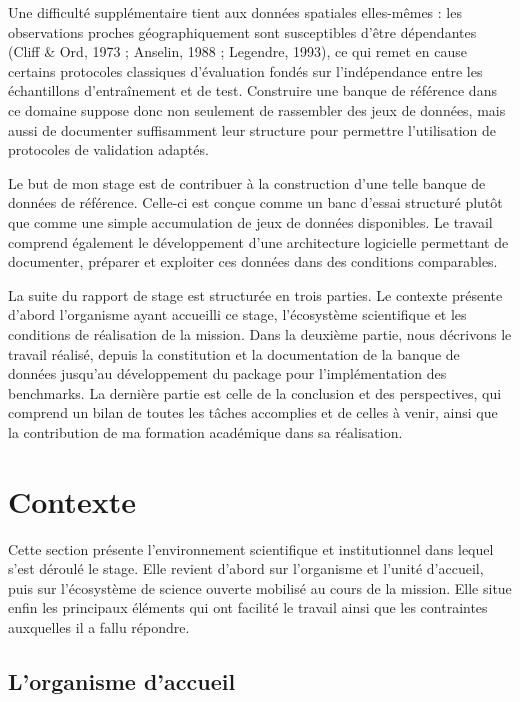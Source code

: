 \documentclass[11pt,a4paper]{article}
\begin{document}
Une difficulté supplémentaire tient aux données spatiales elles-mêmes : les observations proches géographiquement sont susceptibles d'être dépendantes (Cliff \& Ord, 1973 ; Anselin, 1988 ; Legendre, 1993), ce qui remet en cause certains protocoles classiques d'évaluation fondés sur l'indépendance entre les échantillons d'entraînement et de test. Construire une banque de référence dans ce domaine suppose donc non seulement de rassembler des jeux de données, mais aussi de documenter suffisamment leur structure pour permettre l'utilisation de protocoles de validation adaptés.

Le but de mon stage est de contribuer à la construction d'une telle banque de données de référence. Celle-ci est conçue comme un banc d'essai structuré plutôt que comme une simple accumulation de jeux de données disponibles. Le travail comprend également le développement d'une architecture logicielle permettant de documenter, préparer et exploiter ces données dans des conditions comparables.

La suite du rapport de stage est structurée en trois parties. Le contexte présente d'abord l'organisme ayant accueilli ce stage, l'écosystème scientifique et les conditions de réalisation de la mission. Dans la deuxième partie, nous décrivons le travail réalisé, depuis la constitution et la documentation de la banque de données jusqu'au développement du package pour l'implémentation des benchmarks. La dernière partie est celle de la conclusion et des perspectives, qui comprend un bilan de toutes les tâches accomplies et de celles à venir, ainsi que la contribution de ma formation académique dans sa réalisation.
\section{Contexte}

Cette section présente l'environnement scientifique et institutionnel dans lequel s'est déroulé le stage. Elle revient d'abord sur l'organisme et l'unité d'accueil, puis sur l'écosystème de science ouverte mobilisé au cours de la mission. Elle situe enfin les principaux éléments qui ont facilité le travail ainsi que les contraintes auxquelles il a fallu répondre.

\subsection{L'organisme d'accueil}
\end{document}
